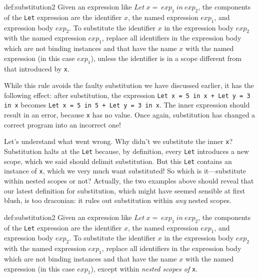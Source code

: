 \documentclass{book}
\renewcommand{\emph}[1]{{\color{blue}\textit{#1}}}
\begin{document}
\begin{mydef}{def:substitution2}
Given an expression like $Let\ x =\ exp_1\ in\ exp_2$,
the components of the \texttt{Let} expression are the 
identifier \texttt{$x$}, the named expression \texttt{$exp_1$}, 
and expression body \texttt{$exp_2$}. To substitute 
the identifier \texttt{$x$} in the expression body \texttt{$exp_2$} 
with the named expression \texttt{$exp_1$}, replace all identifiers 
in the expression body which are not binding instances and 
that have the name \texttt{$x$} with the 
named expression (in this case \texttt{$exp_1$}), unless 
the identifier is in a scope different from that 
introduced by \texttt{x}. 
\end{mydef}

While this rule avoids the faulty substitution we have 
discussed earlier, it has the following effect: 
after substitution, the expression \texttt{Let x = 5 in x + Let y = 3 in x} 
becomes \texttt{Let x = 5 in 5 + Let y = 3 in x}. The inner expression 
should result in an error, because \texttt{x} has no value. 
Once again, substitution has changed a correct program into 
an incorrect one! 

Let's understand what went wrong. Why didn't we substitute 
the inner \texttt{x}? Substitution halts at 
the \texttt{Let} because, by definition, every 
\texttt{Let} introduces a new scope, which we said 
should delimit substitution. But this 
\texttt{Let} contains an instance of \texttt{x}, which we 
very much want substituted! So which is it---substitute 
within nested scopes or not? Actually, the two examples 
above should reveal that our latest definition 
for substitution, which might have seemed sensible at first 
blush, is too draconian: it rules out substitution 
within \emph{any} nested scopes. 


\begin{mydef}{def:substitution2}
Given an expression like $Let\ x =\ exp_1\ in\ exp_2$,
the components of the \texttt{Let} expression are the 
identifier \texttt{$x$}, the named expression \texttt{$exp_1$}, 
and expression body \texttt{$exp_2$}. To substitute 
the identifier \texttt{$x$} in the expression body \texttt{$exp_2$} 
with the named expression \texttt{$exp_1$}, replace all identifiers 
in the expression body which are not binding instances and 
that have the name \texttt{$x$} with the 
named expression (in this case \texttt{$exp_1$}), except within 
\emph{nested scopes of} \texttt{x}. 
\end{mydef}
 
\end{document}
